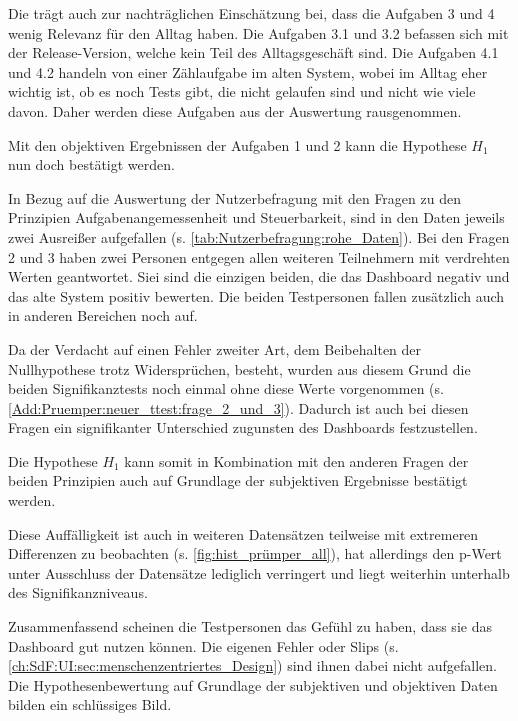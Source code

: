 Die trägt auch zur nachträglichen Einschätzung bei, dass die Aufgaben 3 und 4 wenig Relevanz für den Alltag haben. Die Aufgaben 3.1 und 3.2 befassen sich mit der Release-Version, welche kein Teil des Alltagsgeschäft sind. Die Aufgaben 4.1 und 4.2 handeln von einer Zählaufgabe im alten System, wobei im Alltag eher wichtig ist, ob es noch Tests gibt, die nicht gelaufen sind und nicht wie viele davon. Daher werden diese Aufgaben aus der Auswertung rausgenommen.

Mit den objektiven Ergebnissen der Aufgaben 1 und 2 kann die Hypothese $H_{1}$ nun doch bestätigt werden.

In Bezug auf die Auswertung der Nutzerbefragung mit den Fragen zu den Prinzipien Aufgabenangemessenheit und Steuerbarkeit, sind in den Daten jeweils zwei Ausreißer aufgefallen (s. \autoref{tab:Nutzerbefragung:rohe_Daten}).
Bei den Fragen 2 und 3 haben zwei Personen entgegen allen weiteren Teilnehmern mit verdrehten Werten geantwortet. Siei sind die einzigen beiden, die das Dashboard negativ und das alte System positiv bewerten. Die beiden Testpersonen fallen zusätzlich auch in anderen Bereichen noch auf.

Da der Verdacht auf einen Fehler zweiter Art, dem Beibehalten der Nullhypothese trotz Widersprüchen, besteht, wurden aus diesem Grund die beiden Signifikanztests noch einmal ohne diese Werte vorgenommen (s. \autoref{Add:Pruemper:neuer_ttest:frage_2_und_3}). Dadurch ist auch bei diesen Fragen ein signifikanter Unterschied zugunsten des Dashboards festzustellen.

Die Hypothese $H_{1}$ kann somit in Kombination mit den anderen Fragen der beiden Prinzipien auch auf Grundlage der subjektiven Ergebnisse bestätigt werden.

Diese Auffälligkeit ist auch in weiteren Datensätzen teilweise mit extremeren Differenzen zu beobachten (s. \autoref{fig:hist_prümper_all}), hat allerdings den p-Wert unter Ausschluss der Datensätze lediglich verringert und liegt weiterhin unterhalb des Signifikanzniveaus.

Zusammenfassend scheinen die Testpersonen das Gefühl zu haben, dass sie das Dashboard gut nutzen können. Die eigenen Fehler oder Slips (s. \autoref{ch:SdF:UI:sec:menschenzentriertes_Design}) sind ihnen dabei nicht aufgefallen. Die Hypothesenbewertung auf Grundlage der subjektiven und objektiven Daten bilden ein schlüssiges Bild.

